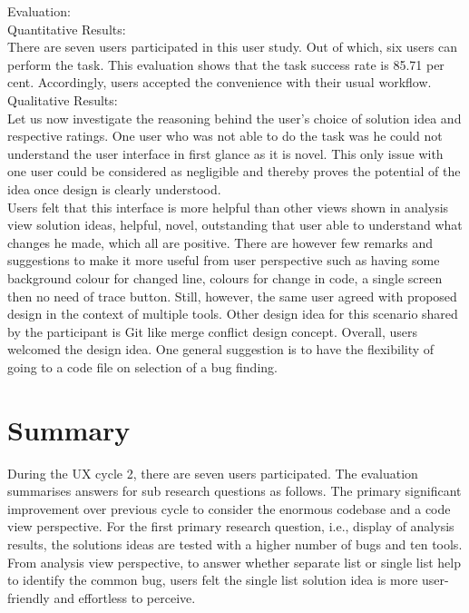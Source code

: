 Evaluation: \\

Quantitative Results: \\

There are seven users participated in this user study. Out of which, six users can perform the task. This evaluation shows that the task success rate is 85.71 per cent. Accordingly, users accepted the convenience with their usual workflow. \\

Qualitative Results: \\

Let us now investigate the reasoning behind the user’s choice of solution idea and respective ratings.  One user who was not able to do the task was he could not understand the user interface in first glance as it is novel. This only issue with one user could be considered as negligible and thereby proves the potential of the idea once design is clearly understood. \\

Users felt that this interface is more helpful than other views shown in analysis view solution ideas, helpful, novel, outstanding that user able to understand what changes he made, which all are positive. There are however few remarks and suggestions to make it more useful from user perspective such as having some background colour for changed line, colours for change in code, a single screen then no need of trace button. Still, however, the same user agreed with proposed design in the context of multiple tools. Other design idea for this scenario shared by the participant is Git like merge conflict design concept. Overall, users welcomed the design idea. One general suggestion is to have the flexibility of going to a code file on selection of a bug finding. \\

\section{Summary}

During the UX cycle 2, there are seven users participated. The evaluation summarises answers for sub research questions as follows. The primary significant improvement over previous cycle to consider the enormous codebase and a code view perspective. For the first primary research question, i.e., display of analysis results, the solutions ideas are tested with a higher number of bugs and ten tools. From analysis view perspective, to answer whether separate list or single list help to identify the common bug, users felt the single list solution idea is more user-friendly and effortless to perceive. \\

